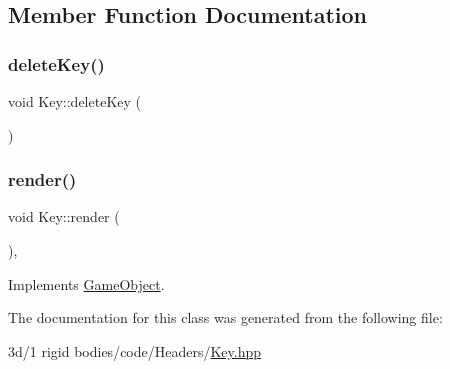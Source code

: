 \subsection{Member Function Documentation}
\mbox{\label{class_key_a6c31c0a20e5bcb5a3e0399498b9d0c14}} 
\subsubsection{\texorpdfstring{delete\+Key()}{deleteKey()}}
{\footnotesize\ttfamily void Key\+::delete\+Key (\begin{DoxyParamCaption}{ }\end{DoxyParamCaption})}

\mbox{\label{class_key_ad7047dce6eba1702bf776cb6ffeab3a6}} 
\subsubsection{\texorpdfstring{render()}{render()}}
{\footnotesize\ttfamily void Key\+::render (\begin{DoxyParamCaption}{ }\end{DoxyParamCaption})\hspace{0.3cm}{\ttfamily [override]}, {\ttfamily [virtual]}}



Implements \mbox{\hyperlink{class_game_object_adee58d508cfa907162d1192a25dc21b9}{Game\+Object}}.



The documentation for this class was generated from the following file\+:\begin{DoxyCompactItemize}
\item 
3d/1 rigid bodies/code/\+Headers/\mbox{\hyperlink{_key_8hpp}{Key.\+hpp}}\end{DoxyCompactItemize}
